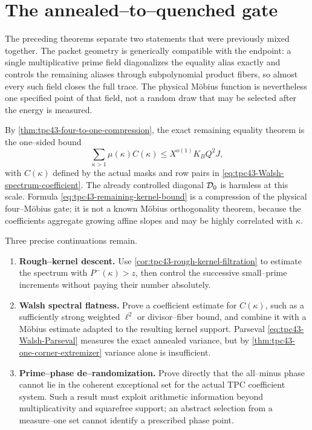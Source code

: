 \section{The annealed--to--quenched gate}
\label{sec:tpc43-next-gate}

The preceding theorems separate two statements that were previously
mixed together.  The packet geometry is generically compatible with the
endpoint: a single multiplicative prime field diagonalizes the equality
alias exactly and controls the remaining aliases through subpolynomial
product fibers, so almost every such field closes the full trace.  The
physical M\"obius function is nevertheless
one specified point of that field, not a random draw that may be selected
after the energy is measured.

By \cref{thm:tpc43-four-to-one-compression}, the exact remaining
equality theorem is the one--sided bound
\begin{equation}
 \sum_{\kappa>1}\mu(\kappa)C(\kappa)
 \le X^{o(1)}K_BQ^2J,
 \label{eq:tpc43-remaining-kernel-bound}
\end{equation}
with \(C(\kappa)\) defined by the actual masks and row pairs in
\eqref{eq:tpc43-Walsh-spectrum-coefficient}.  The already controlled
diagonal \(\mathcal D_0\) is harmless at this scale.  Formula
\eqref{eq:tpc43-remaining-kernel-bound} is a compression of the physical
four--M\"obius gate; it is not a known M\"obius orthogonality theorem,
because the coefficients aggregate growing affine slopes and may be
highly correlated with \(\kappa\).

Three precise continuations remain.
\begin{enumerate}[label=(\alph*)]
 \item \textbf{Rough--kernel descent.}
 Use \cref{cor:tpc43-rough-kernel-filtration} to estimate the spectrum
 with \(P^-(\kappa)>z\), then control the successive small--prime
 increments without paying their number absolutely.

 \item \textbf{Walsh spectral flatness.}
 Prove a coefficient estimate for
 \(C(\kappa)\), such as a sufficiently strong weighted \(\ell^2\) or
 divisor--fiber bound, and combine it with a M\"obius estimate adapted to
 the resulting kernel support.  Parseval
 \eqref{eq:tpc43-Walsh-Parseval} measures the exact annealed variance,
 but by \cref{thm:tpc43-one-corner-extremizer} variance alone is
 insufficient.

 \item \textbf{Prime--phase de--randomization.}
 Prove directly that the all--minus phase cannot lie in the coherent
 exceptional set for the actual TPC coefficient system.  Such a result
 must exploit arithmetic information beyond multiplicativity and
 squarefree support; an abstract selection from a measure--one set cannot
 identify a prescribed phase point.
\end{enumerate}

